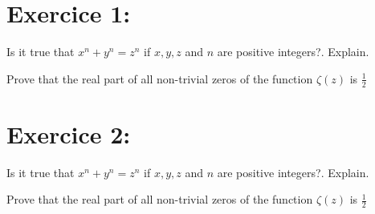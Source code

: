 \documentclass{exam}
\begin{document}
\begin{center}
\end{center}

\vspace{5mm}
\vspace{0.5in}

\section{Exercice 1: }
\begin{questions}
\question [10]
Is it true that \(x^n + y^n = z^n\) if \(x,y,z\) and \(n\) are
positive integers?. Explain.

\vspace{3in}

\question Prove that the real part of all non-trivial zeros of the function
\(\zeta(z)\) is \(\frac{1}{2}\)
\end{questions}


\section{Exercice 2: }
\begin{questions}

\question [10]
Is it true that \(x^n + y^n = z^n\) if \(x,y,z\) and \(n\) are
positive integers?. Explain.

\vspace{3in}

\question Prove that the real part of all non-trivial zeros of the function
\(\zeta(z)\) is \(\frac{1}{2}\)
\end{questions}
\end{document}
